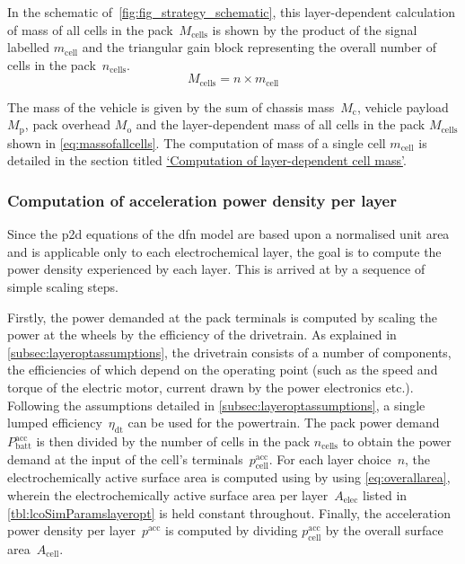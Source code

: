 In  the  schematic  of~\cref{fig:fig_strategy_schematic},  this  layer-dependent
calculation of  mass of all cells  in the pack~$M_\text{cells}$ is  shown by the
product of  the signal  labelled $m_\text{cell}$ and  the triangular  gain block
representing the overall number of cells in the pack~$n_\text{cells}$.
\begin{equation}\label{eq:massofallcells}
    M_\text{cells} = n \times m_\text{cell}
\end{equation}

The   mass    of   the   vehicle    is   given    by   the   sum    of   chassis
mass~$M_\text{c}$,  vehicle  payload  $M_\text{p}$, pack  overhead  $M_\text{o}$
and  the  layer-dependent  mass  of  all  cells  in  the  pack  $M_\text{cells}$
shown   in   \cref{eq:massofallcells}.   The    computation   of   mass   of   a
single   cell    $m_\text{cell}$   is    detailed   in   the    section   titled
\hyperlink{href:layerdependentcellmass}{`Computation  of   layer-dependent  cell
mass'}.

\subsubsection*{Computation of acceleration power density per layer}

Since the \gls{p2d} equations of the \gls{dfn} model are based upon a normalised
unit area and is  applicable only to each electrochemical layer,  the goal is to
compute the  power density experienced  by each layer. This  is arrived at  by a
sequence of simple scaling steps.

Firstly, the  power demanded at  the pack terminals  is computed by  scaling the
power  at the  wheels  by the  efficiency  of the  drivetrain.  As explained  in
\cref{subsec:layeroptassumptions},  the  drivetrain  consists  of  a  number  of
components, the efficiencies of which depend on the operating point (such as the
speed and torque  of the electric motor, current drawn  by the power electronics
etc.). Following the  assumptions detailed in \cref{subsec:layeroptassumptions},
a  single lumped  efficiency~$\eta_\text{dt}$ can  be used  for the  powertrain.
The  pack  power  demand  $P^\text{acc}_\text{batt}$  is  then  divided  by  the
number  of cells  in the  pack $n_\text{cells}$  to obtain  the power  demand at
the  input of  the cell's  terminals~$p^\text{acc}_\text{cell}$. For  each layer
choice~$n$, the electrochemically active surface area is computed using by using
\cref{eq:overallarea},  wherein the  electrochemically active  surface area  per
layer~$A_\text{elec}$ listed in \cref{tbl:lcoSimParamslayeropt} is held constant
throughout.  Finally, the  acceleration power  density per  layer~$p^\text{acc}$
is  computed  by  dividing  $p^\text{acc}_\text{cell}$ by  the  overall  surface
area~$A_\text{cell}$.

